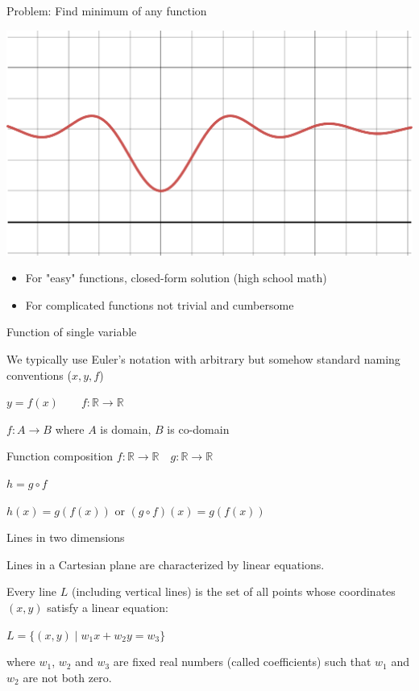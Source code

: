 \documentclass[12pt,aspectratio=169]{beamer}
\begin{document}
\begin{frame}{Problem: Find minimum of any function}

\includegraphics[width=0.7\linewidth]{img/desmos-graph1.pdf}

\begin{itemize}
	\item For "easy" functions, closed-form solution (high school math)
	\item For complicated functions not trivial and cumbersome
\end{itemize}


	
\end{frame}







\begin{frame}{Function of single variable}
	
We typically use Euler's notation with arbitrary but somehow standard naming conventions ($x, y, f$)

$y = f (x) \qquad f: \mathbb{R} \to \mathbb{R}$

$f : A \to B$ where $A$ is domain, $B$ is co-domain

\bigskip

\begin{block}{Function composition}
$f: \mathbb{R} \to \mathbb{R} \quad g: \mathbb{R} \to \mathbb{R}$

$h = g \circ f$

$h(x) = g(f(x))$ or $(g \circ f)(x)= g(f(x))$
\end{block}

\end{frame}


\begin{frame}{Lines in two dimensions}
	
Lines in a Cartesian plane are characterized by linear equations.

Every line $L$ (including vertical lines) is the set of all points whose coordinates $(x, y)$ satisfy a linear equation:

$L=\{(x,y)\mid w_1 x+ w_2 y= w_3\}$

where $w_1$, $w_2$ and $w_3$ are fixed real numbers (called coefficients) such that $w_1$ and $w_2$ are not both zero.
	
\end{frame}
\end{document}
